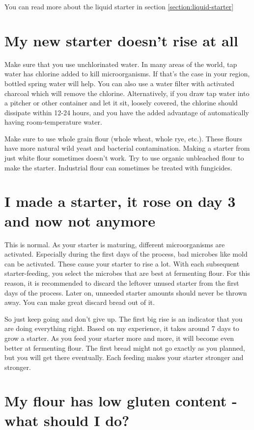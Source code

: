 You can read more about the liquid starter
in section \ref{section:liquid-starter}

\section{My new starter doesn't rise at all}

Make sure that you use unchlorinated water.
In many areas of the world, tap water has
chlorine added to kill microorganisms. If that's
the case in your region, bottled spring water will
help.
You can also use a water filter with activated charcoal
which will remove the chlorine.
Alternatively, if you draw tap water into a pitcher or other
container and let it sit, loosely covered, the chlorine
should dissipate within 12-24 hours, and you have
the added advantage of automatically having
room-temperature water.

Make sure to use whole grain flour (whole wheat, whole rye, etc.).
These flours have more natural wild yeast and
bacterial contamination. Making a starter
from just white flour sometimes doesn't work.
Try to use organic unbleached flour to make
the starter. Industrial flour can sometimes
be treated with fungicides.

\section{I made a starter, it rose on day 3 and now not anymore}

This is normal. As your starter is maturing, different
microorganisms are activated. Especially during
the first days of the process, bad microbes
like mold can be activated. These cause your
starter to rise a lot. With each subsequent
starter-feeding, you select the microbes that are best
at fermenting flour. For this reason, it is
recommended to discard the leftover unused starter
from the first days of the process. Later on, unneeded
starter amounts should never be thrown away. You can make
great discard bread out of it.

So just keep going and don't give up. The first big
rise is an indicator that you are doing everything
right. Based on my experience, it takes around 7
days to grow a starter. As you feed your starter
more and more, it will become even better at fermenting
flour. The first bread might not go exactly as you
planned, but you will get there eventually. Each
feeding makes your starter stronger and stronger.

\section{My flour has low gluten content - what should I do?}

